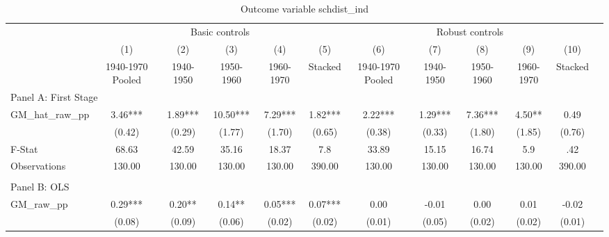  \begin{table}[htbp]\centering {} \begin{threeparttable} \caption{Outcome variable schdist\_ind } \begin{tabular}{l*{11}{c}} \toprule
          &\multicolumn{5}{c}{Basic controls}                                   &\multicolumn{5}{c}{Robust controls}                                  \\\cmidrule(lr){2-6}\cmidrule(lr){7-11}
          &\multicolumn{1}{c}{(1)}&\multicolumn{1}{c}{(2)}&\multicolumn{1}{c}{(3)}&\multicolumn{1}{c}{(4)}&\multicolumn{1}{c}{(5)}&\multicolumn{1}{c}{(6)}&\multicolumn{1}{c}{(7)}&\multicolumn{1}{c}{(8)}&\multicolumn{1}{c}{(9)}&\multicolumn{1}{c}{(10)}\\
          &\multicolumn{1}{c}{1940-1970 Pooled}&\multicolumn{1}{c}{1940-1950}&\multicolumn{1}{c}{1950-1960}&\multicolumn{1}{c}{1960-1970}&\multicolumn{1}{c}{Stacked}&\multicolumn{1}{c}{1940-1970 Pooled}&\multicolumn{1}{c}{1940-1950}&\multicolumn{1}{c}{1950-1960}&\multicolumn{1}{c}{1960-1970}&\multicolumn{1}{c}{Stacked}\\
\cmidrule(lr){1-11}
\multicolumn{10}{l}{Panel A: First Stage}\\
\cmidrule(lr){1-11}
GM\_hat\_raw\_pp&      3.46***&      1.89***&     10.50***&      7.29***&      1.82***&      2.22***&      1.29***&      7.36***&      4.50** &      0.49   \\
          &    (0.42)   &    (0.29)   &    (1.77)   &    (1.70)   &    (0.65)   &    (0.38)   &    (0.33)   &    (1.80)   &    (1.85)   &    (0.76)   \\
\midrule
F-Stat    &     68.63   &     42.59   &     35.16   &     18.37   &       7.8   &     33.89   &     15.15   &     16.74   &       5.9   &       .42   \\
Observations&    130.00   &    130.00   &    130.00   &    130.00   &    390.00   &    130.00   &    130.00   &    130.00   &    130.00   &    390.00   \\
\cmidrule[\heavyrulewidth](lr){1-11} \\ \cmidrule[\heavyrulewidth](lr){1-11}
\multicolumn{10}{l}{Panel B: OLS}\\
\cmidrule(lr){1-11}
GM\_raw\_pp &      0.29***&      0.20** &      0.14** &      0.05***&      0.07***&      0.00   &     -0.01   &      0.00   &      0.01   &     -0.02   \\
          &    (0.08)   &    (0.09)   &    (0.06)   &    (0.02)   &    (0.02)   &    (0.01)   &    (0.05)   &    (0.02)   &    (0.02)   &    (0.01)   \\

\end{tabular}
\end{threeparttable}
\end{table}
